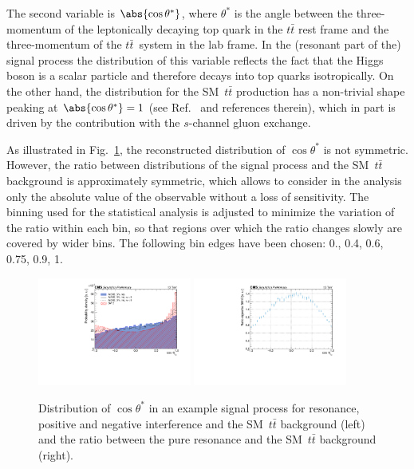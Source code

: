The second variable is $\abs{\cos\theta^*}$, where $\theta^*$ is the angle between the three-momentum of the leptonically decaying top quark in the $t\bar{t}$ rest frame and the three-momentum of the $t\bar{t}$~system in the lab frame.
In the (resonant part of the) signal process the distribution of this variable reflects the fact that the Higgs boson is a scalar particle and therefore decays into top quarks isotropically.
On the other hand, the distribution for the SM~$t\bar{t}$ production has a non-trivial shape peaking at $\abs{\cos\theta^*} = 1$ (see Ref.~\cite{Dicus:1994bm} and references therein), which in part is driven by the contribution with the $s$-channel gluon exchange.

As illustrated in Fig.~\ref{Fig:CosThetaStar}, the reconstructed distribution of $\cos\theta^*$ is not symmetric.
However, the ratio between distributions of the signal process and the SM~$t\bar{t}$ background is approximately symmetric, which allows to consider in the analysis only the absolute value of the observable without a loss of sensitivity.
The binning used for the statistical analysis is adjusted to minimize the variation of the ratio within each bin, so that regions over which the ratio changes slowly are covered by wider bins.
The following bin edges have been chosen: 0., 0.4, 0.6, 0.75, 0.9, 1.

\begin{figure}
  \centering
  \includegraphics[width=0.45\textwidth]{fig/chapt5/searchVars/CosTopLepTT.pdf}
  \includegraphics[width=0.45\textwidth]{fig/chapt5/searchVars/CosTopLepTT_ratio.pdf}
  \caption{Distribution of $\cos\theta^*$ in an example signal process for resonance, positive and negative interference and the SM~$t\bar{t}$ background (left) and the ratio between the pure resonance and the SM~$t\bar{t}$ background (right).}
  \label{Fig:CosThetaStar}
\end{figure}

